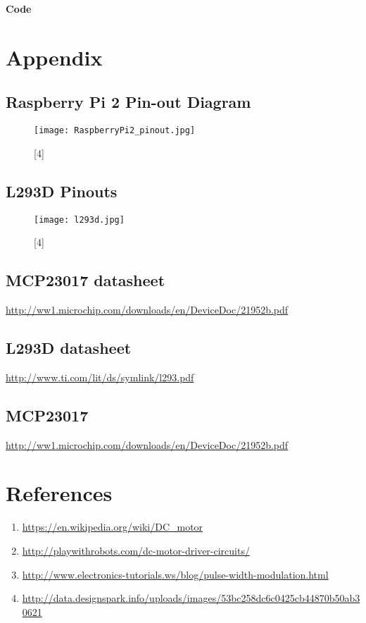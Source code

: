 \documentclass[11pt,a4paper]{article}
\begin{document}
	\newpage 
	\textbf{Code}
	\vspace{0.3cm}
	
	
	
	\newpage
	\section{Appendix}
	
	\subsection{Raspberry Pi 2 Pin-out Diagram}
	\begin{figure}[h!]
		\texttt{[image: RaspberryPi2\_pinout.jpg]}
		\centering
		\caption{[4]}
	\end{figure}
	\subsection{L293D Pinouts}
	\begin{figure}[h!]
		\texttt{[image: l293d.jpg]}
		\centering
		\caption{[4]}
	\end{figure}
	
	\subsection{MCP23017 datasheet}
	
	\url{http://ww1.microchip.com/downloads/en/DeviceDoc/21952b.pdf}
	\subsection{L293D datasheet}
	
	\url{http://www.ti.com/lit/ds/symlink/l293.pdf}
	\subsection{MCP23017}
	\url{http://ww1.microchip.com/downloads/en/DeviceDoc/21952b.pdf}
	
	\section{References}
	\begin{enumerate}
		\item \url{https://en.wikipedia.org/wiki/DC_motor}
		\item \url{http://playwithrobots.com/dc-motor-driver-circuits/}
		\item \url{http://www.electronics-tutorials.ws/blog/pulse-width-modulation.html}
		\item \url{http://data.designspark.info/uploads/images/53bc258dc6c0425cb44870b50ab30621}
	\end{enumerate}
	
\end{document}
